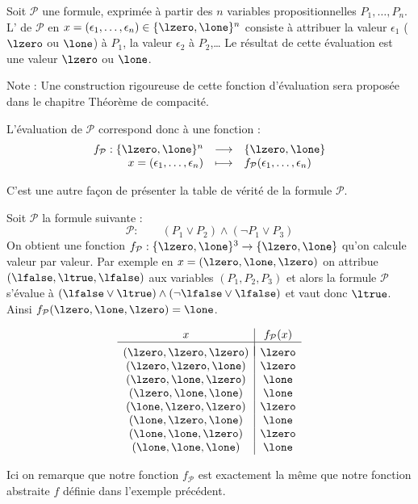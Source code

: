\documentclass[11pt,class=report,crop=false]{standalone}
\begin{document}
Soit $\mathcal{P}$ une formule, exprimée à partir des $n$ variables propositionnelles $P_1,\ldots,P_n$.
L' de $\mathcal{P}$ en $x = (\epsilon_1,\ldots,\epsilon_n) \in \{\lzero,\lone\}^n$ consiste 
à attribuer la valeur $\epsilon_1$ ($\lzero$ ou $\lone$) à $P_1$, la valeur $\epsilon_2$ à $P_2$,\ldots{} Le résultat de cette évaluation est une valeur $\lzero$ ou $\lone$.

Note : Une construction rigoureuse de cette fonction d'évaluation sera proposée dans le chapitre \og{}Théorème de compacité\fg{}.

L'évaluation de $\mathcal{P}$ correspond donc à une fonction :
\[
\begin{array}{rcl}
	f_{\mathcal{P}} : \{\lzero,\lone\}^n & \longrightarrow & \{\lzero,\lone\} \\
	x= (\epsilon_1,\ldots,\epsilon_n) & \longmapsto & f_{\mathcal{P}}(\epsilon_1,\ldots,\epsilon_n) 
\end{array}
\]

C'est une autre façon de présenter la table de vérité de la formule $\mathcal{P}$.


\begin{exemple}
	Soit $\mathcal{P}$ la formule suivante :
	\[
	\mathcal{P} : \qquad (P_1 \lor P_2) \land (\lnot P_1 \lor P_3)
	\]
	On obtient une fonction $f_{\mathcal{P}} : \{\lzero,\lone\}^3 \to \{\lzero,\lone\}$ qu'on calcule valeur par valeur.
	Par exemple en $x=(\lzero,\lone,\lzero)$ on attribue $(\lfalse,\ltrue,\lfalse)$ aux variables $(P_1,P_2,P_3)$ et alors la formule $\mathcal{P}$ s'évalue à $(\lfalse \lor \ltrue) \land (\lnot \lfalse \lor \lfalse)$ et vaut donc $\ltrue$. Ainsi $f_{\mathcal{P}}(\lzero,\lone,\lzero) = \lone$.

	\[
	\begin{array}{c|c}
		x & f_{\mathcal{P}}(x) \\
		\hline
		& \\[-2ex]
		(\lzero,\lzero,\lzero) & \lzero \\
		(\lzero,\lzero,\lone)  & \lzero \\
		(\lzero,\lone,\lzero)  & \lone \\
		(\lzero,\lone,\lone)   & \lone \\
		(\lone,\lzero,\lzero)  & \lzero \\
		(\lone,\lzero,\lone)   & \lone \\
		(\lone,\lone,\lzero)   & \lzero \\
		(\lone,\lone,\lone)    & \lone \\
	\end{array}
	\]
	
	Ici on remarque que notre fonction $f_\mathcal{P}$ est exactement la même que notre fonction abstraite $f$ définie dans l'exemple précédent.
		
\end{exemple}
\end{document}
